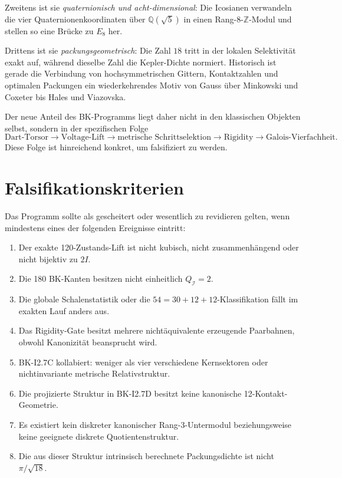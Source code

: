 \documentclass[11pt,a4paper]{article}
\theoremstyle{definition}
\theoremstyle{remark}
\newcommand{\QI}{Q_{\mathcal I}}
\newcommand{\QQ}{\mathbb Q}
\newcommand{\ZZ}{\mathbb Z}
\begin{document}
Zweitens ist sie \emph{quaternionisch und acht-dimensional}: Die Icosianen verwandeln die vier Quaternionenkoordinaten über $\QQ(\sqrt5)$ in einen Rang-8-$\ZZ$-Modul und stellen so eine Brücke zu $E_8$ her.

Drittens ist sie \emph{packungsgeometrisch}: Die Zahl $18$ tritt in der lokalen Selektivität exakt auf, während dieselbe Zahl die Kepler-Dichte normiert. Historisch ist gerade die Verbindung von hochsymmetrischen Gittern, Kontaktzahlen und optimalen Packungen ein wiederkehrendes Motiv von Gauss über Minkowski und Coxeter bis Hales und Viazovska.

Der neue Anteil des BK-Programms liegt daher nicht in den klassischen Objekten selbst, sondern in der spezifischen Folge
\[
\text{Dart-Torsor}
\to
\text{Voltage-Lift}
\to
\text{metrische Schrittselektion}
\to
\text{Rigidity}
\to
\text{Galois-Vierfachheit}.
\]
Diese Folge ist hinreichend konkret, um falsifiziert zu werden.

\section{Falsifikationskriterien}
Das Programm sollte als gescheitert oder wesentlich zu revidieren gelten, wenn mindestens eines der folgenden Ereignisse eintritt:
\begin{enumerate}
\item Der exakte 120-Zustands-Lift ist nicht kubisch, nicht zusammenhängend oder nicht bijektiv zu $2I$.
\item Die 180 BK-Kanten besitzen nicht einheitlich $\QI=2$.
\item Die globale Schalenstatistik oder die $54=30+12+12$-Klassifikation fällt im exakten Lauf anders aus.
\item Das Rigidity-Gate besitzt mehrere nichtäquivalente erzeugende Paarbahnen, obwohl Kanonizität beansprucht wird.
\item BK-I2.7C kollabiert: weniger als vier verschiedene Kernsektoren oder nichtinvariante metrische Relativstruktur.
\item Die projizierte Struktur in BK-I2.7D besitzt keine kanonische 12-Kontakt-Geometrie.
\item Es existiert kein diskreter kanonischer Rang-3-Untermodul beziehungsweise keine geeignete diskrete Quotientenstruktur.
\item Die aus dieser Struktur intrinsisch berechnete Packungsdichte ist nicht $\pi/\sqrt{18}$.
\end{enumerate}
\end{document}

